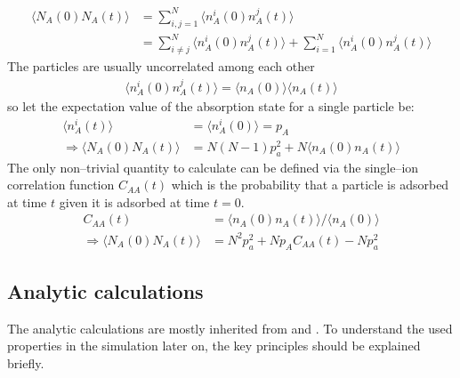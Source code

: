 \documentclass[a4paper, parskip=half]{scrartcl}
\newcommand{\myEqLabel}[1]{\label{eq:#1}}
\begin{document}
\begin{align}
\langle N_A(0) N_A(t)\rangle &= \sum_{i,j = 1}^N \langle n_A^i(0) n_A^j(t)\rangle\\
&= \sum_{i \neq j}^N \langle n_A^i(0) n_A^j(t)\rangle + \sum_{i =1}^N \langle n_A^i(0) n_A^j(t)\rangle
\end{align}
The particles are usually uncorrelated among each other 
\begin{align}
\langle n_A^i(0) n_A^j(t)\rangle = \langle n_A(0) \rangle\langle n_A(t) \rangle
\end{align}
so let the expectation value of the absorption state for a single particle be:
\begin{align}
\langle n_A^i(t) \rangle &= \langle n_A^i(0) \rangle = p_A \myEqLabel{p_A}\\
\Rightarrow \langle N_A(0) N_A(t)\rangle &= N(N-1)p_a^2 + N\langle n_A(0) n_A(t)\rangle
\end{align}
The only non--trivial quantity to calculate can be defined via the single--ion correlation function $C_{AA}(t)$ which is the probability that a particle is adsorbed at time $t$ given it is adsorbed at time $t=0$.
\begin{align}
C_{AA}(t) &= \langle n_A(0) n_A(t) \rangle / \langle n_A(0) \rangle \\
\Rightarrow \langle N_A(0) N_A(t)\rangle &= N^2p_a^2 + Np_AC_{AA}(t) - Np_a^2
\end{align}
\subsection{Analytic calculations}
The analytic calculations are mostly inherited from \cite{netzpaper} and \cite{netzpaper2}. To understand the used properties in the simulation later on, the key principles should be explained briefly.
\end{document}
